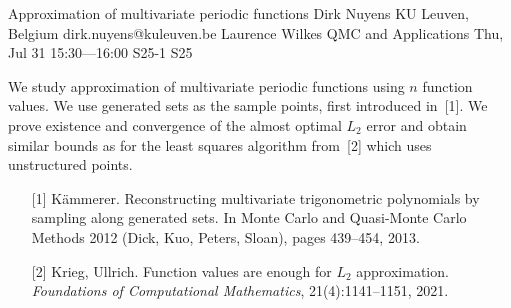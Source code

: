 \begin{talk}
\end{talk}

\begin{talk}
  {Approximation of multivariate periodic functions}%
  {Dirk Nuyens}%
  {KU Leuven, Belgium}%
  {dirk.nuyens@kuleuven.be}%
  {Laurence Wilkes}%
  {QMC and Applications}%
  {Thu, Jul 31 15:30---16:00}%
  {S25-1}%
  {S25}%
    
   
  We study approximation of multivariate periodic functions using $n$
  function values. We use generated sets as the sample points, first
  introduced in~[1]. We prove existence and convergence of the almost
  optimal $L_2$ error and obtain similar bounds as for the least squares
  algorithm from~[2] which uses unstructured points.

\medskip

\begin{enumerate}
  \item[{[1]}]
    K{\"a}mmerer.
    Reconstructing multivariate trigonometric polynomials by sampling along generated sets.
    In Monte Carlo and Quasi-Monte Carlo Methods 2012 (Dick, Kuo, Peters, Sloan), pages 439--454, 2013.
  \item[{[2]}]
    Krieg, Ullrich.
    Function values are enough for $L_2$ approximation.
    \emph{Foundations of Computational Mathematics}, 21(4):1141--1151, 2021.
\end{enumerate}

\end{talk}

